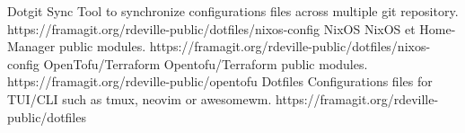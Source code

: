 \project
{Dotgit Sync}
{Tool to synchronize configurations files across multiple git repository.}
{%
}
{https://framagit.org/rdeville-public/dotfiles/nixos-config}
\project%
{NixOS}%
{NixOS et Home-Manager public modules.}%
{%
}%
{https://framagit.org/rdeville-public/dotfiles/nixos-config}
\project%
{OpenTofu/Terraform}%
{Opentofu/Terraform public modules.}%
{%
}%
{https://framagit.org/rdeville-public/opentofu}
\project%
{Dotfiles}%
{Configurations files for TUI/CLI such as tmux, neovim or awesomewm.}%
{%
}%
{https://framagit.org/rdeville-public/dotfiles}
